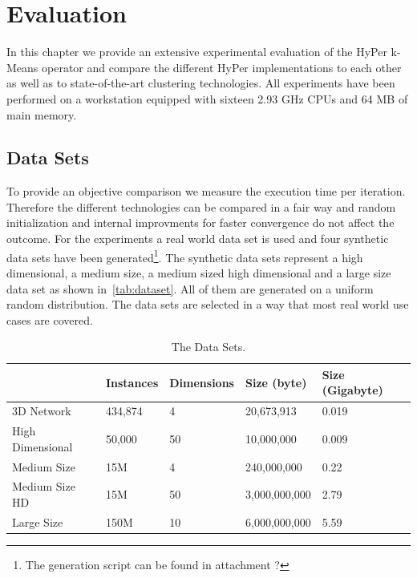 \chapter{Evaluation}\label{chapter:evaluation}

In this chapter we provide an extensive experimental evaluation of the HyPer k-Means operator and compare the different HyPer implementations to each other as well as to state-of-the-art clustering technologies. All experiments have been performed on a workstation equipped with sixteen 2.93 GHz CPUs and 64 MB of main memory.


\section{Data Sets}
To provide an objective comparison we measure the execution time per iteration. Therefore the different technologies can be compared in a fair way and random initialization and internal improvments for faster convergence do not affect the outcome. For the experiments a real world data set is used and four synthetic data sets have been generated\footnote{The generation script can be found in attachment ?}. The synthetic data sets represent a high dimensional, a medium size, a medium sized high dimensional and a large size data set as shown in~\autoref{tab:dataset}. All of them are generated on a uniform random distribution. The data sets are selected in a way that most real world use cases are covered.

\begin{table}[htsb]
  \caption[The Data Sets]{The Data Sets.}\label{tab:dataset}
  \centering
  \begin{tabular}{l l l l l}
    \toprule
      & Instances & Dimensions & Size (byte) & Size (Gigabyte) \\
    \midrule
      3D Network        & 434,874    & 4     & 20,673,913 & 0.019 \\
      High Dimensional  & 50,000     & 50    & 10,000,000 & 0.009 \\
      Medium Size       & 15M       & 4     & 240,000,000 & 0.22 \\
      Medium Size HD    & 15M       & 50    & 3,000,000,000 & 2.79 \\
      Large Size        & 150M      & 10    & 6,000,000,000 & 5.59 \\
    \bottomrule
  \end{tabular}
\end{table}




